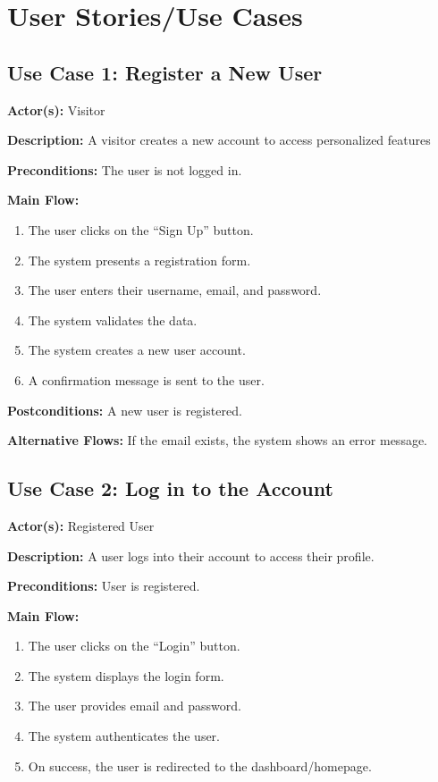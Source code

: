\documentclass[12pt]{article}
\begin{document}
\section{User Stories/Use Cases}\label{sec:user-stories/use-cases}

\subsection*{Use Case 1: Register a New User}
\textbf{Actor(s):} Visitor

\textbf{Description:} A visitor creates a new account to access personalized features

\textbf{Preconditions:} The user is not logged in.

\textbf{Main Flow:}
\begin{enumerate}
    	\item The user clicks on the ``Sign Up'' button.
    	\item The system presents a registration form.
    	\item The user enters their username, email, and password.
    	\item The system validates the data.
    	\item The system creates a new user account.
		\item A confirmation message is sent to the user.
\end{enumerate}
\textbf{Postconditions:} A new user is registered.

\textbf{Alternative Flows:} If the email exists, the system shows an error message.

\subsection*{Use Case 2: Log in to the Account}

\textbf{Actor(s):} Registered User

\textbf{Description:} A user logs into their account to access their profile.

\textbf{Preconditions:} User is registered.

\textbf{Main Flow:}
\begin{enumerate}
  	\item The user clicks on the ``Login'' button.
  	\item The system displays the login form.
  	\item The user provides email and password.
  	\item The system authenticates the user.
	\item On success, the user is redirected to the dashboard/homepage.
\end{enumerate}
\end{document}
